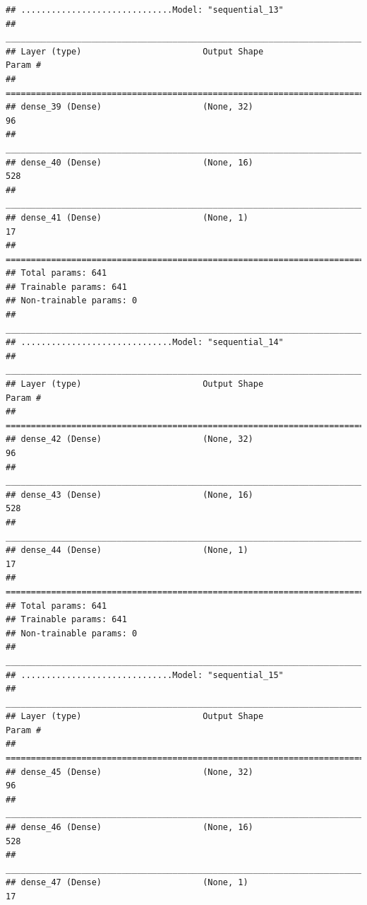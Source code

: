 \documentclass[
]{article}
\begin{document}
\begin{verbatim}
## ..............................Model: "sequential_13"
## ________________________________________________________________________________
## Layer (type)                        Output Shape                    Param #     
## ================================================================================
## dense_39 (Dense)                    (None, 32)                      96          
## ________________________________________________________________________________
## dense_40 (Dense)                    (None, 16)                      528         
## ________________________________________________________________________________
## dense_41 (Dense)                    (None, 1)                       17          
## ================================================================================
## Total params: 641
## Trainable params: 641
## Non-trainable params: 0
## ________________________________________________________________________________
## ..............................Model: "sequential_14"
## ________________________________________________________________________________
## Layer (type)                        Output Shape                    Param #     
## ================================================================================
## dense_42 (Dense)                    (None, 32)                      96          
## ________________________________________________________________________________
## dense_43 (Dense)                    (None, 16)                      528         
## ________________________________________________________________________________
## dense_44 (Dense)                    (None, 1)                       17          
## ================================================================================
## Total params: 641
## Trainable params: 641
## Non-trainable params: 0
## ________________________________________________________________________________
## ..............................Model: "sequential_15"
## ________________________________________________________________________________
## Layer (type)                        Output Shape                    Param #     
## ================================================================================
## dense_45 (Dense)                    (None, 32)                      96          
## ________________________________________________________________________________
## dense_46 (Dense)                    (None, 16)                      528         
## ________________________________________________________________________________
## dense_47 (Dense)                    (None, 1)                       17          

\end{verbatim}
\end{document}
